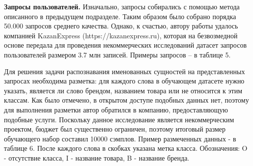 \documentclass[12pt,a4paper]{article}
\begin{document}
\begin{table}[H]
\begin{center}
    \caption{Примеры товаров из даннных с соревнования DataFusion}
\end{center}
\end{table}

\textbf{Запросы пользователей.} Изначально, запросы собирались с помощью метода описанного в предыдущем подразделе. Таким образом было собрано порядка 50.000 запросов среднего качества. Однако, к счастью, автору работы удалось компанией KazanExpress (https://kazanexpress.ru), которая на безвозмедной основе передала для проведения некоммерческих исследований датасет запросов пользователей размером 3.7 млн записей. Примеры запросов -- в таблице 5.

\begin{table}[H]
\begin{center}
    \caption{Примеры запросов в поисковую систему KazanExpress}
\end{center}
\end{table}

\noindent Для решения задачи распознавания именованных сущностей на представленных запросах необходима разметка: для каждого слова в обучающем датасете нужно указать, является ли слово брендом, названием товара или не относится к этим классам. Как было отмечено, в открытом доступе подобных данных нет, поэтому для выполнения разметки автор обратился в компанию, предоставляющую подобные услуги. Поскольку данное исследование является некоммерческим проектом, бюджет был существенно ограничен, поэтому итоговый размер обучающего набор составил 10000 сэмплов. Пример размеченных данных - в таблице 6. После каждого слова в скобках указана метка класса. Обозначения: O - отсутствие класса, I - название товара, B - название бренда.
\end{document}
